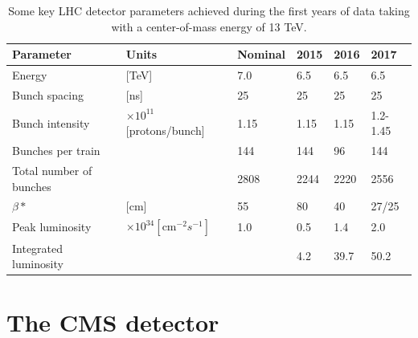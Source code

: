 \begin{table}[]
\begin{tabular}{| l | lllll |}
\hline
Parameter               & Units                                      & Nominal & 2015 & 2016 & 2017     \\
\hline
Energy                  & {[}TeV{]}                                  & 7.0     & 6.5  & 6.5  & 6.5      \\
Bunch spacing           & {[}ns{]}                                   & 25      & 25   & 25   & 25       \\
Bunch intensity         & $\times10^{11}${[}protons/bunch{]}         & 1.15    & 1.15 & 1.15 & 1.2-1.45 \\
Bunches per train       &                                            & 144     & 144  & 96   & 144      \\
Total number of bunches &                                            & 2808    & 2244 & 2220 & 2556     \\
$\beta*$                & {[}cm{]}                                   & 55      & 80   & 40   & 27/25    \\
Peak luminosity         & $\times 10^{34} [\textrm{cm}^{-2} s^{-1}]$ & 1.0     & 0.5  & 1.4  & 2.0      \\
Integrated luminosity   &                                            &         & 4.2  & 39.7 & 50.2     \\
\hline
\end{tabular}
\caption{Some key LHC detector parameters achieved during the first years of data taking with a center-of-mass energy of 13 TeV.}
\label{tab:LHCparameters}
\end{table}


\section{The CMS detector}

